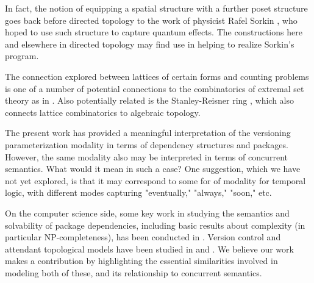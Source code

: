 \documentclass[hoptionsi,review,format=acmsmall]{acmart}
\theoremstyle{definition}
\newcommand{\band}{\mathbin{\&}}
\newcommand{\bor}{\mathbin{|}}
\newcommand{\Dia}{\diamondsuit}
\begin{document}
In fact, the notion of equipping a spatial structure with a further poset structure goes back before directed topology to the work of physicist Rafel Sorkin \cite{sorkin1983posets}, who hoped to use such structure to capture quantum effects. The constructions here and elsewhere in directed topology may find use in helping to realize Sorkin's program.

The connection explored between lattices of certain forms and counting problems is one of a number of potential connections to the combinatorics of extremal set theory as in \cite{stanley2013algebraic}. Also potentially related is the Stanley-Reisner ring \cite{francisco2014survey}, which also connects lattice combinatorics to algebraic topology.

The present work has provided a meaningful interpretation of the versioning parameterization modality in terms of dependency structures and packages. However, the same modality also may be interpreted in terms of concurrent semantics. What would it mean in such a case? One suggestion, which we have not yet explored, is that it may correspond to some for of modality for temporal logic, with different modes capturing "eventually," "always," "soon," etc.

On the computer science side, some key work in studying the semantics and solvability of package dependencies, including basic results about complexity (in particular NP-completeness),  has been conducted in \cite{di2006edos, abate2012dependency} . Version control and attendant topological models have been studied in \cite{angiuli2014homotopical} and \cite{mimram2013categorical}. We believe our work makes a contribution by highlighting the essential similarities involved in modeling both of these, and its relationship to concurrent semantics.



%
\end{document}
